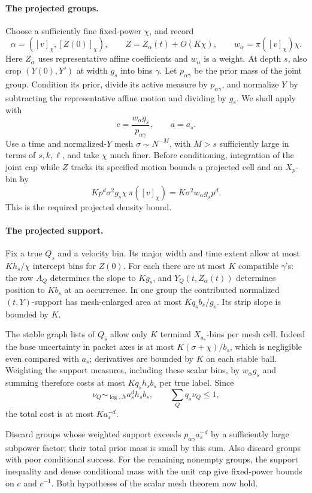\paragraph{The projected groups.}
Choose a sufficiently fine fixed-power \(\chi\), and record
\[
 \alpha=([v]_\chi,[Z(0)]_\chi),\qquad
 Z=Z_\alpha(t)+O(K\chi),\qquad
 w_\alpha=\pi([v]_\chi)\chi.
\]
Here \(Z_\alpha\) uses representative affine coefficients and
\(w_\alpha\) is a weight.  At depth \(s\), also crop
\((Y(0),Y')\) at width \(g_s\) into bins \(\gamma\).
Let \(p_{\alpha\gamma}\) be the prior mass of the joint group.
Condition its prior, divide its active measure by
\(p_{\alpha\gamma}\), and normalize \(Y\) by subtracting the
representative affine motion and dividing by \(g_s\).
We shall apply  with
\[
 c=\frac{w_\alpha g_s}{p_{\alpha\gamma}},\qquad a=a_s.
\]
Use a time and normalized-\(Y\) mesh
\(\sigma\sim N^{-M}\), with \(M>s\) sufficiently large in
terms of \(s,k,\ell\), and take \(\chi\) much finer.
Before conditioning, integration of the joint cap while \(Z\)
tracks its specified motion bounds a projected cell and an
\(X_p\)-bin by
\[
 Kp^d\sigma^2g_s\chi\,\pi([v]_\chi)
   =K\sigma^2w_\alpha g_sp^d.
\]
This is the required projected density bound.

\paragraph{The projected support.}
Fix a true \(Q_s\) and a velocity bin.  Its major width and time
extent allow at most \(Kh_s/\chi\) intercept bins for \(Z(0)\).
For each there are at most \(K\) compatible \(\gamma\)'s:
the row \(A_Q\) determines the slope to \(Kg_s\), and
\(Y_Q(t,Z_\alpha(t))\) determines position to \(Kb_s\) at
an occurrence.  In one group the contributed normalized
\((t,Y)\)-support has mesh-enlarged area at most
\(Kq_sb_s/g_s\).  Its strip slope is bounded by \(K\).

The stable graph lists of \(Q_s\) allow only \(K\) terminal
\(X_{a_s}\)-bins per mesh cell.  Indeed the base uncertainty in
packet axes is at most \(K(\sigma+\chi)/b_s\), which is
negligible even compared with \(a_s\); derivatives are bounded
by \(K\) on each stable ball.  Weighting the support measures,
including these scalar bins, by \(w_\alpha g_s\) and summing
therefore costs at most \(Kq_sh_sb_s\) per true label.  Since
\[
 \nu_Q\sim_{\log,N}a_s^dh_sb_s,
 \qquad \sum_Qq_s\nu_Q\le1,
\]
the total cost is at most \(Ka_s^{-d}\).

Discard groups whose weighted support exceeds
\(p_{\alpha\gamma}a_s^{-d}\) by a sufficiently large subpower
factor; their total prior mass is small by this sum.  Also discard
groups with poor conditional success.  For the remaining nonempty
groups, the support inequality and dense conditional mass with the
unit cap give fixed-power bounds on \(c\) and \(c^{-1}\).
Both hypotheses of the scalar mesh theorem now hold.

